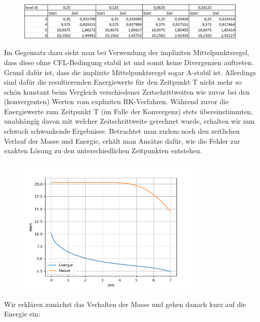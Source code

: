 \begin{figure}[H]
	\centering
	\includegraphics[width=\textwidth]{../Aufgabe21/rkorder-2RiemannEnergieTabelle.png}

\end{figure}
Im Gegensatz dazu sieht man bei Verwendung der impliziten Mittelpunktsregel, dass diese ohne CFL-Bedingung stabil ist und somit keine Divergenzen auftreten. Grund dafür ist, dass die implizite Mittelpunktsregel sogar A-stabil ist.
Allerdings sind dafür die resultierenden Energiewerte für den Zeitpunkt T nicht mehr so schön konstant beim Vergleich verschiedener Zeitschrittweiten wie zuvor bei den (konvergenten) Werten vom expliziten RK-Verfahren.
Während zuvor die Energiewerte zum Zeitpunkt T (im Falle der Konvergenz) stets übereinstimmten, unabhängig davon mit welcher Zeitschrittweite gerechnet wurde, erhalten wir nun schwach schwankende Ergebnisse.
Betrachtet man zudem noch den zeitlichen Verlauf der Masse und Energie, erhält man Ansätze dafür, wie die Fehler zur exakten Lösung zu den unterschiedlichen Zeitpunkten entstehen.
\begin{figure}[H]
	\centering
    \includegraphics[width=0.8\textwidth]{../Aufgabe21/zeitverlauf.png}
\end{figure}
Wir erklären zunächst das Verhalten der Masse und gehen danach kurz auf die Energie ein:

